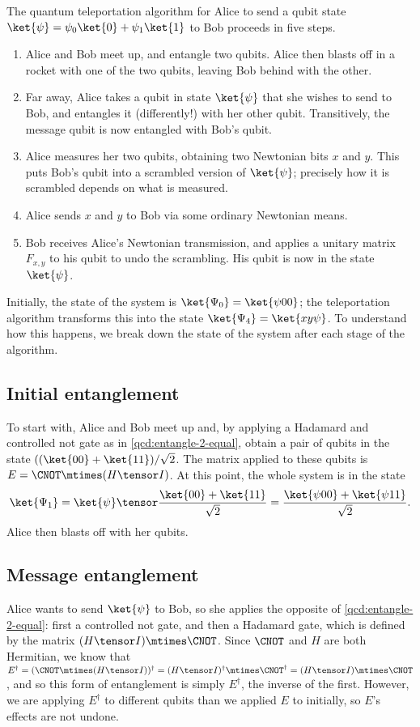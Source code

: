 The quantum teleportation algorithm for Alice to send a qubit state $\ket{\psi}
= \psi_0\ket{0} + \psi_1\ket{1}$ to Bob proceeds in five steps.
\begin{enumerate}
\item {}  Alice and Bob meet up, and entangle two
  qubits.  Alice then blasts off in a rocket with one of the two qubits, leaving
  Bob behind with the other.
\item {}  Far away, Alice takes a qubit in state
  $\ket{\psi}$ that she wishes to send to Bob, and entangles it (differently!)
  with her other qubit.  Transitively, the message qubit is now entangled with
  Bob's qubit.
\item {}  Alice measures her two qubits, obtaining two
  Newtonian bits $x$ and $y$.  This puts Bob's qubit into a scrambled version of
  $\ket{\psi}$; precisely how it is scrambled depends on what is measured.
\item {}  Alice sends $x$ and $y$ to Bob via some
  ordinary Newtonian means.
\item {}  Bob receives Alice's Newtonian transmission, and applies a
  unitary matrix $F_{x,y}$ to his qubit to undo the scrambling.  His qubit is
  now in the state $\ket{\psi}$.
\end{enumerate}
Initially, the state of the system is $\ket{\Psi_0} = \ket{\psi00}$; the
teleportation algorithm transforms this into the state $\ket{\Psi_4} =
\ket{xy\psi}$.  To understand how this happens, we break down the state of the
system after each stage of the algorithm.

\subsection{Initial entanglement}\label{sec:initial-entanglement}
To start with, Alice and Bob meet up and, by applying a Hadamard and controlled
not gate as in \cref{qcd:entangle-2-equal}, obtain a pair of qubits in the state
$((\ket{00} + \ket{11})/\sqrt{2}$.  The matrix applied to these qubits is $E =
\CNOT \mtimes (H \tensor I)$.  At this point, the whole system is in the
state \[ \ket{\Psi_1} = \ket{\psi} \tensor \frac{\ket{00} + \ket{11}}{\sqrt{2}}
= \frac{\ket{\psi00} + \ket{\psi11}}{\sqrt{2}}. \] Alice then blasts off with
her qubits.

\subsection{Message entanglement}\label{sec:message-entanglement}
Alice wants to send $\ket{\psi}$ to Bob, so she applies the opposite of
\cref{qcd:entangle-2-equal}: first a controlled not gate, and then a Hadamard
gate, which is defined by the matrix $(H \tensor I) \mtimes \CNOT$.  Since
$\CNOT$ and $H$ are both Hermitian, we know that $E^\dag = (\CNOT \mtimes (H
\tensor I))^\dag = (H \tensor I)^\dag \mtimes \CNOT^\dag = (H \tensor I) \mtimes
\CNOT$, and so this form of entanglement is simply $E^\dag$, the inverse of the
first.  However, we are applying $E^\dag$ to different qubits than we applied
$E$ to initially, so $E$'s effects are not undone.

